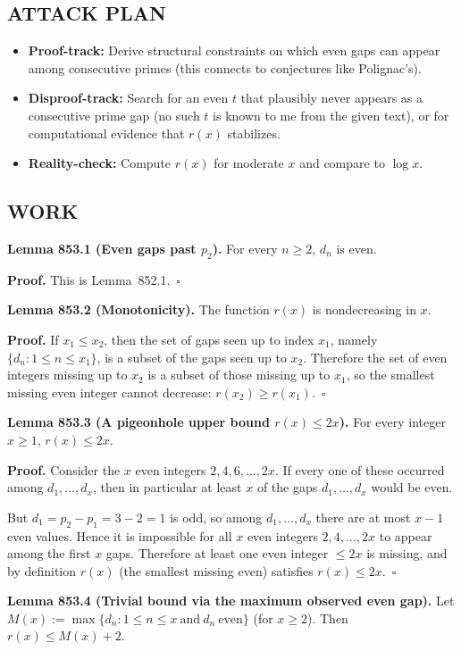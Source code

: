 \subsection*{ATTACK PLAN}
\begin{itemize}
\item \textbf{Proof-track:} Derive structural constraints on which even gaps can appear among consecutive primes (this connects to conjectures like Polignac's).
\item \textbf{Disproof-track:} Search for an even $t$ that plausibly never appears as a consecutive prime gap (no such $t$ is known to me from the given text), or for computational evidence that $r(x)$ stabilizes.
\item \textbf{Reality-check:} Compute $r(x)$ for moderate $x$ and compare to $\log x$.
\end{itemize}

\subsection*{WORK}
\textbf{Lemma 853.1 (Even gaps past $p_2$).}
For every $n\ge 2$, $d_n$ is even.

\textbf{Proof.}
This is Lemma~852.1.\ $\square$

\medskip
\textbf{Lemma 853.2 (Monotonicity).}
The function $r(x)$ is nondecreasing in $x$.

\textbf{Proof.}
If $x_1\le x_2$, then the set of gaps seen up to index $x_1$, namely $\{d_n:1\le n\le x_1\}$, is a subset of the gaps seen up to $x_2$. Therefore the set of even integers missing up to $x_2$ is a subset of those missing up to $x_1$, so the smallest missing even integer cannot decrease: $r(x_2)\ge r(x_1)$.\ $\square$

\medskip
\textbf{Lemma 853.3 (A pigeonhole upper bound $r(x)\le 2x$).}
For every integer $x\ge 1$, $r(x)\le 2x$.

\textbf{Proof.}
Consider the $x$ even integers $2,4,6,\dots,2x$. If every one of these occurred among $d_1,\dots,d_x$, then in particular at least $x$ of the gaps $d_1,\dots,d_x$ would be even.

But $d_1=p_2-p_1=3-2=1$ is odd, so among $d_1,\dots,d_x$ there are at most $x-1$ even values. Hence it is impossible for all $x$ even integers $2,4,\dots,2x$ to appear among the first $x$ gaps. Therefore at least one even integer $\le 2x$ is missing, and by definition $r(x)$ (the smallest missing even) satisfies $r(x)\le 2x$.\ $\square$

\medskip
\textbf{Lemma 853.4 (Trivial bound via the maximum observed even gap).}
Let $M(x):=\max\{d_n:1\le n\le x\ \text{and}\ d_n\ \text{even}\}$ (for $x\ge 2$). Then $r(x)\le M(x)+2$.

